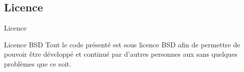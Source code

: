 \subsection{Licence}
\begin{frame}{Licence}
	\begin{block}{Licence BSD}
        Tout le code présenté est sous licence BSD afin de permettre de pouvoir
        être développé et continué par d'autres personnes aux sans quelques
        problèmes que ce soit.
	\end{block}
\end{frame}


